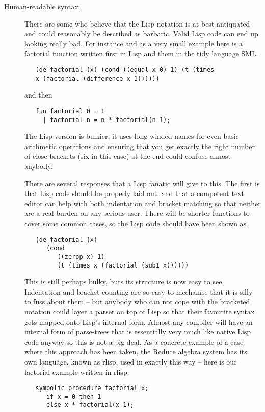 \begin{description}
\item[Human-readable syntax:] There are some who believe that the Lisp notation
is at best antiquated and could reasonably be described as barbaric. Valid
Lisp code can end up looking really bad. For instance and as a very small
example here is a factorial function written first in Lisp and them
in the tidy language SML\cite{SML}.
{\small\begin{verbatim}
   (de factorial (x) (cond ((equal x 0) 1) (t (times
   x (factorial (difference x 1))))))
\end{verbatim}}
\noindent and then
{\small\begin{verbatim}
   fun factorial 0 = 1
     | factorial n = n * factorial(n-1);
\end{verbatim}}
The Lisp version is bulkier, it uses long-winded names for
even basic arithmetic operations and ensuring that you get exactly
the right number of close brackets (six in this case) at the end could
confuse almost anybody.

There are several responses that a Lisp fanatic will give to this. The
first is that Lisp code should be properly laid out, and that a competent
text editor can help with both indentation and bracket matching so that
neither are a real burden on any serious user. There will be shorter
functions to cover some common cases, so the Lisp code should have been
shown as
{\small\begin{verbatim}
   (de factorial (x)
      (cond
         ((zerop x) 1)
         (t (times x (factorial (sub1 x))))))
\end{verbatim}}
This is still perhaps bulky, buts its structure is now easy to see. Indentation
and bracket counting are so easy to mechanise that it is silly to fuss about
them -- but anybody who can not cope with the bracketed notation could layer
a parser on top of Lisp so that their favourite syntax gets mapped onto
Lisp's internal form. Almost any compiler will have an internal form
of parse-trees that is essentially very much like native Lisp code anyway
so this is not a big deal. As a concrete example of a case where this
approach has been taken, the Reduce algebra system\cite{Reduce} has its
own language, known as {\tx rlisp}, used in exactly this way -- here is our
factorial example written in {\tx rlisp}.
{\small\begin{verbatim}
   symbolic procedure factorial x;
      if x = 0 then 1
      else x * factorial(x-1);
\end{verbatim}}


\end{description}
